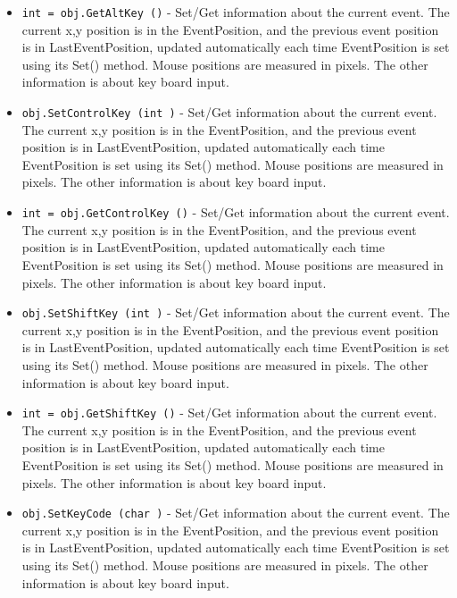 \begin{itemize}
\item  \verb|int = obj.GetAltKey ()| -  Set/Get information about the current event. 
 The current x,y position is in the EventPosition, and the previous
 event position is in LastEventPosition, updated automatically each
 time EventPosition is set using its Set() method. Mouse positions
 are measured in pixels.
 The other information is about key board input.

\item  \verb|obj.SetControlKey (int )| -  Set/Get information about the current event. 
 The current x,y position is in the EventPosition, and the previous
 event position is in LastEventPosition, updated automatically each
 time EventPosition is set using its Set() method. Mouse positions
 are measured in pixels.
 The other information is about key board input.

\item  \verb|int = obj.GetControlKey ()| -  Set/Get information about the current event. 
 The current x,y position is in the EventPosition, and the previous
 event position is in LastEventPosition, updated automatically each
 time EventPosition is set using its Set() method. Mouse positions
 are measured in pixels.
 The other information is about key board input.

\item  \verb|obj.SetShiftKey (int )| -  Set/Get information about the current event. 
 The current x,y position is in the EventPosition, and the previous
 event position is in LastEventPosition, updated automatically each
 time EventPosition is set using its Set() method. Mouse positions
 are measured in pixels.
 The other information is about key board input.

\item  \verb|int = obj.GetShiftKey ()| -  Set/Get information about the current event. 
 The current x,y position is in the EventPosition, and the previous
 event position is in LastEventPosition, updated automatically each
 time EventPosition is set using its Set() method. Mouse positions
 are measured in pixels.
 The other information is about key board input.

\item  \verb|obj.SetKeyCode (char )| -  Set/Get information about the current event. 
 The current x,y position is in the EventPosition, and the previous
 event position is in LastEventPosition, updated automatically each
 time EventPosition is set using its Set() method. Mouse positions
 are measured in pixels.
 The other information is about key board input.


\end{itemize}
